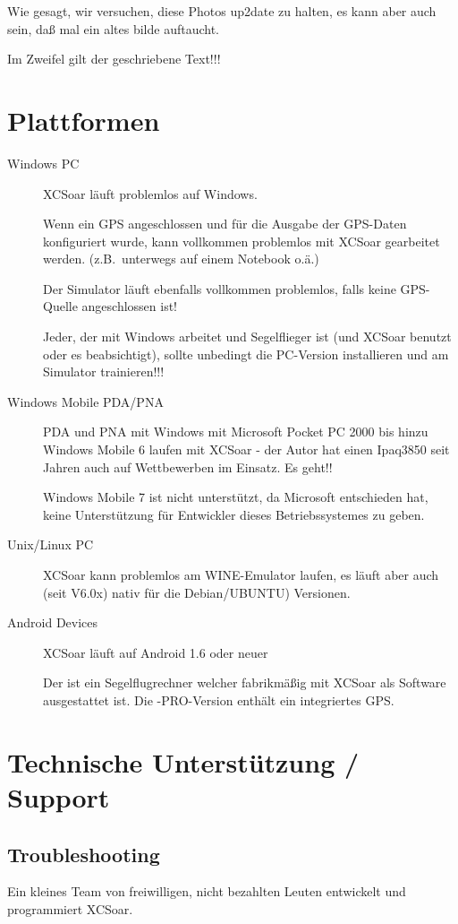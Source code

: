 Wie gesagt, wir versuchen, diese Photos up2date zu halten, es kann aber auch sein, daß mal ein altes bilde auftaucht.

Im Zweifel gilt der geschriebene Text!!!

\section{Plattformen}
\begin{description}
\item[Windows PC]
\textsf{XCSoar} läuft problemlos auf Windows.

Wenn ein GPS angeschlossen und für die Ausgabe der GPS-Daten konfiguriert wurde, kann vollkommen problemlos mit \textsf{XCSoar} gearbeitet 
werden.  (z.B.\ unterwegs auf einem Notebook o.ä.)

Der Simulator läuft ebenfalls vollkommen problemlos, falls keine GPS-Quelle angeschlossen ist!

Jeder, der mit Windows arbeitet und Segelflieger ist (und \textsf{XCSoar} benutzt oder es beabsichtigt), sollte unbedingt die 
PC-Version installieren und am Simulator trainieren!!! 
\item[Windows Mobile PDA/PNA]
PDA und PNA mit Windows mit Microsoft Pocket PC 2000 bis hinzu Windows Mobile 6 laufen mit \textsf{XCSoar} - der Autor hat einen Ipaq3850 seit Jahren 
auch auf Wettbewerben im Einsatz. Es geht!!

Windows Mobile 7 ist nicht unterstützt, da Microsoft entschieden hat, keine Unterstützung für Entwickler dieses 
Betriebssystemes zu geben.
\item[Unix/Linux PC]
\textsf{XCSoar} kann problemlos am WINE-Emulator laufen, es läuft aber auch (seit V6.0x) nativ für die Debian/UBUNTU) Versionen.
\item[Android Devices] \textsf{XCSoar} läuft auf Android 1.6 oder neuer 
\item[\al] Der \al ist ein Segelflugrechner welcher fabrikmäßig mit \textsf{XCSoar} als Software ausgestattet ist. 
Die \al-PRO-Version enthält ein integriertes GPS.
\end{description}


\section{Technische Unterstützung / Support}

\subsection*{Troubleshooting}
Ein kleines Team von freiwilligen, nicht bezahlten Leuten entwickelt und programmiert \textsf{XCSoar}. 

